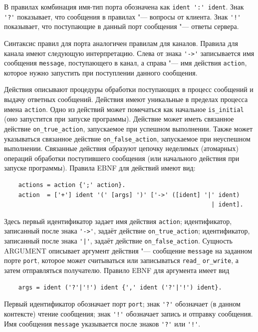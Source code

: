 В правилах комбинация имя-тип порта обозначена как \verb"ident ':' ident". Знак \verb"'?'" показывает, что сообщения в правилах "--- вопросы от клиента. 
Знак \verb"'!'" показывает, что поступающие в данный порт сообщения "--- ответы сервера. 

Синтаксис правил для порта аналогичен правилам для каналов. Правила для канала имеют следующую интерпретацию. 
Слева от знака \verb"'->'" записывается имя сообщения \verb"message", поступающего в канал, а справа "--- имя действия \verb"action", которое нужно запустить при поступлении данного сообщения.


Действия описывают процедуры обработки поступающих в процесс сообщений и выдачу ответных сообщений. 
Действия имеют уникальные в пределах процесса имена \verb"action". 
Одно из действий может помечаться как начальное \verb"is_initial" (оно запустится при запуске программы). 
Действие может иметь связанное действие \verb"on_true_action", запускаемое при успешном выполнении. 
Также может указываться связанное действие \verb"on_false_action", запускаемое при неуспешном выполнении. 
Связанные действия образуют цепочку неделимых (атомарных) операций обработки поступившего сообщения (или начального действия при запуске программы). Правила EBNF для действий имеют вид:
\begin{verbatim}
    actions = action {';' action}.
    action  = ['+'] ident '(' [args] ')' ['->' ([ident] '|' ident) 
                                                          | ident].
\end{verbatim}

Здесь первый идентификатор задает имя действия \verb"action"; идентификатор, записанный после знака \verb"'->'", задаёт действие \verb"on_true_action";  идентификатор, записанный после знака \verb"'|'", задаёт действие \verb"on_false_action".
Сущность ARGUMENT описывает аргумент действия "--- сообщение \verb"message" на заданном порте \verb"port", которое может считываться или записываться \verb"read_" \verb"or_write", а затем отправляться получателю. Правило EBNF для аргумента имеет вид  
\begin{verbatim}
    args = ident ('?'|'!') ident {',' ident ('?'|'!') ident}.
\end{verbatim}

Первый идентификатор обозначает порт \verb"port"; знак \verb"'?'" обозначает (в данном контексте) чтение сообщения; 
знак \verb"'!'" обозначает запись и отправку сообщения. 
Имя сообщения \verb"message" указывается после знаков \verb"'?'" или \verb"'!'".

